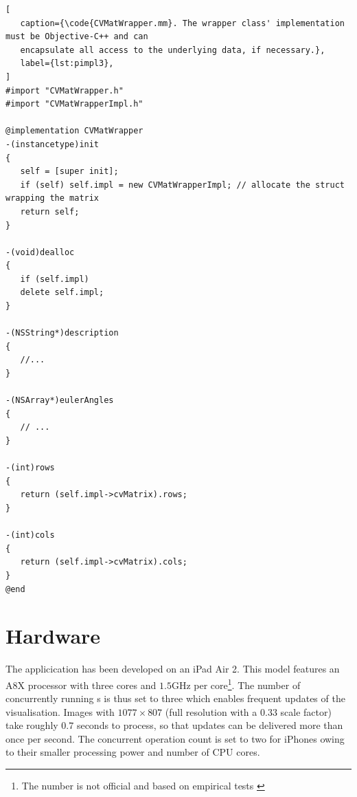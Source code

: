 \begin{lstlisting}[
   caption={\code{CVMatWrapper.mm}. The wrapper class' implementation must be Objective-C++ and can
   encapsulate all access to the underlying data, if necessary.},
   label={lst:pimpl3},
]
#import "CVMatWrapper.h"
#import "CVMatWrapperImpl.h"

@implementation CVMatWrapper
-(instancetype)init
{
   self = [super init];
   if (self) self.impl = new CVMatWrapperImpl; // allocate the struct wrapping the matrix
   return self;
}

-(void)dealloc
{
   if (self.impl)
   delete self.impl;
}

-(NSString*)description
{
   //...
}

-(NSArray*)eulerAngles
{
   // ...
}

-(int)rows
{
   return (self.impl->cvMatrix).rows;
}

-(int)cols
{
   return (self.impl->cvMatrix).cols;
}
@end
\end{lstlisting}

\section{Hardware}

The applicication has been developed on an iPad Air 2. This model features an
A8X processor with three cores and $1.5$GHz per core\footnote{The number is not
official and based on empirical tests \citep{a8x}}. The number of concurrently
running s is thus set to three which
enables frequent updates of the visualisation. Images with $1077\times 807$
(full resolution with a $0.33$ scale factor) take roughly $0.7$ seconds to
process, so that updates can be delivered more than once per second. The
concurrent operation count is set to two for iPhones owing to their smaller
processing power and number of CPU cores.


